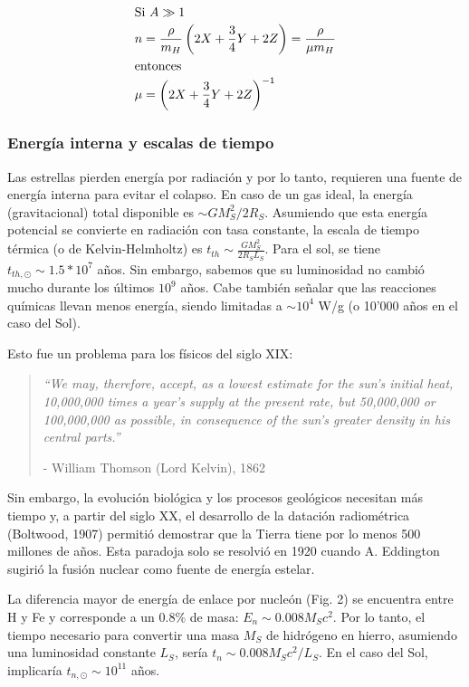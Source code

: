 \documentclass[11pt,letterpaper]{article}
\begin{document}
\begin{align}
    \intertext{Si $A \gg 1$ }
    n &= \frac{\rho}{m_H} \left(2X + \frac{3}{4} Y + 2Z\right) = \frac{\rho}{\mu m_H} \\
    \intertext{entonces}
    \mu &= \left(2X + \frac{3}{4}Y + 2Z\right)^{-1}
\end{align}

\subsubsection{Energía interna y escalas de tiempo}

Las estrellas pierden energía por radiación y por lo tanto, requieren una fuente de energía interna para evitar el colapso. En caso de un gas ideal, la energía (gravitacional) total disponible es $\sim GM_S^2/2R_S$. Asumiendo que esta energía potencial se convierte en radiación con tasa constante, la escala de tiempo térmica (o de Kelvin-Helmholtz) es $t_{th} \sim \frac{GM_S ^2}{2R_S L_S}$. 
Para el sol, se tiene $t_{th, \odot} \sim 1.5*10^7$ años. Sin embargo, sabemos que su luminosidad no cambió mucho durante los últimos $10^9$ años. Cabe también señalar que las reacciones químicas llevan menos energía, siendo limitadas a $\sim 10^4$ W/g (o 10'000 años en el caso del Sol).

Esto fue un problema para los físicos del siglo XIX:

\begin{quote}
    \itshape
    ``We may, therefore, accept, as a lowest estimate for the sun's initial heat, 10,000,000 times a year's supply at the present rate, but 50,000,000 or 100,000,000 as possible, in consequence of the sun's greater density in his central parts.''
    \upshape
    \par\vspace{0.5em}
    \raggedleft
    - William Thomson (Lord Kelvin), 1862
\end{quote}

Sin embargo, la evolución biológica y los procesos geológicos necesitan más tiempo y, a partir del siglo XX, el desarrollo de la datación radiométrica (Boltwood, 1907) permitió demostrar que la Tierra tiene por lo menos 500 millones de años.
Esta paradoja solo se resolvió en 1920 cuando A. Eddington sugirió la fusión nuclear como fuente de energía estelar.

La diferencia mayor de energía de enlace por nucleón (Fig. 2) se encuentra entre H y Fe y corresponde a un $0.8\%$ de masa: $E_n \sim 0.008 M_S c^2$. Por lo tanto, el tiempo necesario para convertir una masa $M_S$ de hidrógeno en hierro, asumiendo una luminosidad constante $L_S$, sería $t_n \sim 0.008 M_S c^2/L_S$.
En el caso del Sol, implicaría $t_{n, \odot} \sim 10^{11}$ años.
\end{document}
